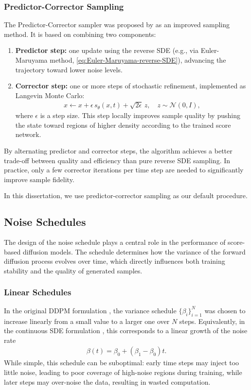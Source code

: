 \documentclass[a4paper,12pt]{article}
\begin{document}
\subsubsection{Predictor-Corrector Sampling}
The Predictor-Corrector sampler was proposed by \citet{song2021ScoreBasedGenerativeModeling} as an improved sampling method. It is based on combining two components:
\begin{enumerate}
    \item \textbf{Predictor step:} one update using the reverse SDE (e.g., via Euler-Maruyama method, \cref{eq:Euler-Maruyama-reverse-SDE}), advancing the trajectory toward lower noise levels.
    \item \textbf{Corrector step:} one or more steps of stochastic refinement, implemented as Langevin Monte Carlo:
        \begin{align*}
            x \leftarrow x + \epsilon\, s_\theta(x,t) + \sqrt{2\epsilon}\,z, \quad z \sim \mathcal{N}(0,I),
        \end{align*}
        where \(\epsilon\) is a step size. This step locally improves sample quality by pushing the state toward regions of higher density according to the trained score network.
\end{enumerate}
By alternating predictor and corrector steps, the algorithm achieves a better trade-off between quality and efficiency than pure reverse SDE sampling. 
In practice, only a few corrector iterations per time step are needed to significantly improve sample fidelity.

In this dissertation, we use predictor-corrector sampling as our default procedure.

\subsection{Noise Schedules}
The design of the noise schedule plays a central role in the performance of score-based diffusion models. 
The schedule determines how the variance of the forward diffusion process evolves over time, which directly influences both training stability and the quality of generated samples.

\subsubsection*{Linear Schedules}
In the original DDPM formulation \citep{hoDenoisingDiffusionProbabilistic2020}, the variance schedule \(\{\beta_i\}_{i=1}^N\) was chosen to increase linearly from a small value to a larger one over \(N\) steps. Equivalently, in the continuous SDE formulation \citep{song2021ScoreBasedGenerativeModeling}, this corresponds to a linear growth of the noise rate
\begin{align*}
    \beta\!\left(t\right)=\beta_0+\left(\beta_1-\beta_0\right)t.
\end{align*}
While simple, this schedule can be suboptimal: early time steps may inject too little noise, leading to poor coverage of high-noise regions during training, while later steps may over-noise the data, resulting in wasted computation.
\end{document}
